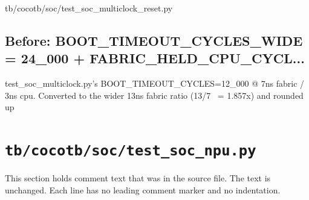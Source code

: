 \begin{relocated}{tb/cocotb/soc/test_soc_multiclock_reset.py}
\subsection*{Before: BOOT\_TIMEOUT\_CYCLES\_WIDE = 24\_000 + FABRIC\_HELD\_CPU\_CYCL...}

\begin{textblock}
test_soc_multiclock.py's BOOT_TIMEOUT_CYCLES=12_000 @ 7ns fabric / 3ns cpu.
Converted to the wider 13ns fabric ratio (13/7 ~= 1.857x) and rounded up
\end{textblock}

\end{relocated}

\section{\texttt{tb/cocotb/soc/test\_soc\_npu.py}}\label{tm:suite:soc-test-soc-npu}

This section holds comment text that was in the source file. The text is unchanged. Each line has no leading comment marker and no indentation.

